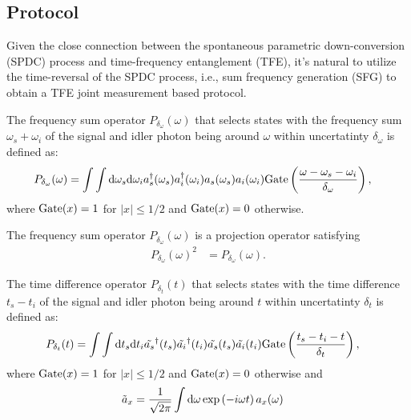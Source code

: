 \documentclass[../../note.tex]{subfiles}
\begin{document}
\subsection{Protocol}
Given the close connection between the spontaneous parametric down-conversion (SPDC) process and time-frequency entanglement (TFE), it's natural to utilize the time-reversal of the SPDC process, i.e., sum frequency generation (SFG) to obtain a TFE joint measurement based protocol.

\begin{definition}
    The frequency sum operator  $P_{\delta_{\omega}}(\omega)$ that selects states with the frequency sum $\omega_s + \omega_i$ of the signal and idler photon being around $\omega$ within uncertatinty $\delta_{\omega}$  is defined as:
    \begin{align}
        P_{\delta_{\omega}}(\omega)
        &= \int \int {\rm d}\omega_s{\rm d}\omega_i a_s^\dagger(\omega_s) a_i^\dagger(\omega_i) a_s(\omega_s) a_i(\omega_i) {\rm Gate}\left(\frac{\omega -\omega_s-\omega_i}{\delta_{\omega}}\right),
    \end{align}
    where ${\rm Gate}(x) = 1$ for $\vert x \vert \leq 1/2$ and ${\rm Gate}(x) = 0$ otherwise.
\end{definition}

\begin{lemma}
    The frequency sum operator  $P_{\delta_{\omega}}(\omega)$ is a projection operator satisfying
    \begin{align}
        P_{\delta_{\omega}}(\omega)^2
        &= P_{\delta_{\omega}}(\omega).
    \end{align}
\end{lemma}

\begin{definition}
    The time difference operator $P_{\delta_{t}}(t)$ that selects states with the time difference $t_s - t_i$ of the signal and idler photon being around $t$ within uncertatinty $\delta_{t}$  is defined as:
    \begin{align}
        P_{\delta_{t}}(t)
        &= \int \int {\rm d}t_s{\rm d}t_i \tilde{a_s}^\dagger(t_s) \tilde{a_i}^\dagger(t_i) \tilde{a_s}(t_s) \tilde{a_i}(t_i) {\rm Gate}\left(\frac{t_s -t_i-t}{\delta_{t}}\right),
    \end{align}
    where ${\rm Gate}(x) = 1$ for $\vert x \vert \leq 1/2$ and ${\rm Gate}(x) = 0$ otherwise and 
    \begin{align}
        \tilde{a}_x
        &= \frac{1}{\sqrt{2 \pi}} \int {\rm d}\omega \exp\left(-i\omega t\right)a_x(\omega)
    \end{align}
\end{definition}
\end{document}
